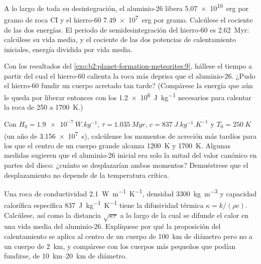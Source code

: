 \begin{exercise}[$\star\star$]\label{exo:b2:planet-formation-meteorites:9}
A lo largo de toda su desintegración, el aluminio-26 libera \qty{5.07e10}{erg} por gramo de roca CI
y el hierro-60 \qty{7.49e7}{erg} por gramo. Calcúlese el cociente de las dos
energías. El periodo de semidesintegración del hierro-60 es \qty{2.62}{Myr}: calcúlese su vida media,
y el cociente de las dos potencias de calentamiento iniciales, energía dividida por vida media.
\end{exercise}

\begin{exercise}[$\star\star\star$]\label{exo:b2:planet-formation-meteorites:10}
Con los resultados del \cref{exo:b2:planet-formation-meteorites:9}, hállese el tiempo a partir del cual el hierro-60 calienta la roca
más deprisa que el aluminio-26. ¿Pudo el hierro-60 fundir un cuerpo acretado tan
tarde? (Compárese la energía que aún le queda por liberar entonces con los
\qty{1.2e6}{J.kg^{-1}} necesarios para calentar la roca de \num{250} a \qty{1700}{K}.)
\end{exercise}

\begin{exercise}[$\star\star\star$]\label{exo:b2:planet-formation-meteorites:11}
Con $H_0 = \qty{1.9e-7}{W.kg^{-1}}$, $\tau = \qty{1.035}{Myr}$,
$c = \qty{837}{J.kg^{-1}.K^{-1}}$ y $T_0 = \qty{250}{K}$ (un año de
\qty{3.156e7}{s}), calcúlense los momentos de acreción más tardíos para los que el centro de un
cuerpo grande alcanza \qty{1200}{K} y \qty{1700}{K}. Algunas medidas sugieren que
el aluminio-26 inicial era solo la mitad del valor canónico en partes del disco:
¿cuánto se desplazarían ambos momentos? Demuéstrese que el desplazamiento no depende de la
temperatura crítica.
\end{exercise}

\begin{exercise}[$\star\star\star$]\label{exo:b2:planet-formation-meteorites:12}
Una roca de conductividad \qty{2.1}{W.m^{-1}.K^{-1}}, densidad
\qty{3300}{kg.m^{-3}} y capacidad calorífica específica \qty{837}{J.kg^{-1}.K^{-1}} tiene
la difusividad térmica $\kappa = k/(\rho c)$. Calcúlese, así como la distancia
$\sqrt{\kappa\tau}$ a lo largo de la cual se difunde el calor en una vida media del aluminio-26.
Explíquese por qué la proposición del calentamiento se aplica al centro de un cuerpo
de \qty{100}{km} de diámetro pero no a un cuerpo de \qty{2}{km}, y compárese con los
cuerpos más pequeños que podían fundirse, de \qtyrange{10}{20}{km} de diámetro.
\end{exercise}

